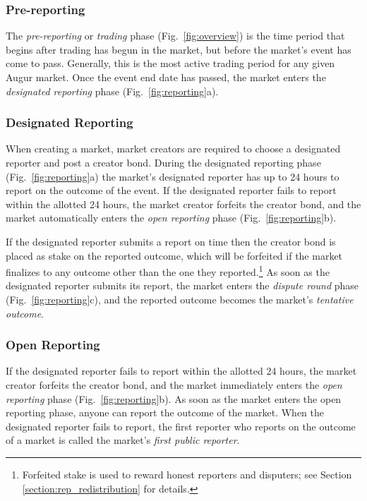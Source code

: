 \documentclass[floatfix,reprint,nofootinbib,amsmath,amssymb,epsfig,pre,floats,letterpaper,groupedaffiliation]{revtex4-1}
\theoremstyle{definition}
\theoremstyle{definition}
\begin{document}
\subsubsection{Pre-reporting}

The \textit{pre-reporting} or \textit{trading} phase (Fig.~\ref{fig:overview}) is the time period that begins after trading has begun in the market, but before the market's event has come to pass.  Generally, this is the most active trading period for any given Augur market.  Once the event end date has passed, the market enters the \textit{designated reporting} phase (Fig.~\ref{fig:reporting}a).

\subsubsection{Designated Reporting}

When creating a market, market creators are required to choose a designated reporter and post a creator bond.  During the designated reporting phase (Fig.~\ref{fig:reporting}a) the market's designated reporter has up to 24 hours to report on the outcome of the event.  If the designated reporter fails to report within the allotted 24 hours, the market creator forfeits the creator bond, and the market automatically enters the \textit{open reporting} phase (Fig.~\ref{fig:reporting}b).

If the designated reporter submits a report on time then the creator bond is placed as stake on the reported outcome, which will be forfeited if the market finalizes to any outcome other than the one they reported.\footnote{Forfeited stake is used to reward honest reporters and disputers; see Section \ref{section:rep_redistribution} for details.}  As soon as the designated reporter submits its report, the market enters the \textit{dispute round} phase (Fig.~\ref{fig:reporting}c), and the reported outcome becomes the market's \textit{tentative outcome}.

\subsubsection{Open Reporting}\label{section:open_reporting}

If the designated reporter fails to report within the allotted 24 hours, the market creator forfeits the creator bond, and the market immediately enters the \textit{open reporting} phase (Fig.~\ref{fig:reporting}b).  As soon as the market enters the open reporting phase, anyone can report the outcome of the market.  When the designated reporter fails to report, the first reporter who reports on the outcome of a market is called the market's \textit{first public reporter}.
\end{document}

